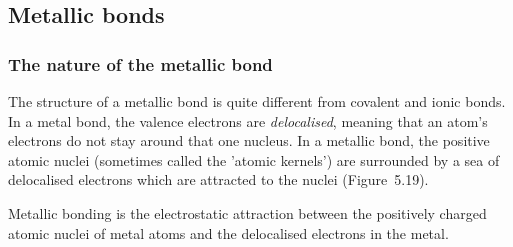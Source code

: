             \subsection{ Metallic bonds}
            \nopagebreak
      \label{m38694*uid77}
            \subsubsection{ The nature of the metallic bond}
            \nopagebreak
        \label{m38694*id142901}The structure of a metallic bond is quite different from covalent and ionic bonds. In a metal bond, the valence electrons are \textsl{delocalised}, meaning that an atom's electrons do not stay around that one nucleus. In a metallic bond, the positive atomic nuclei (sometimes called the 'atomic kernels') are surrounded by a sea of delocalised electrons which are attracted to the nuclei (Figure~5.19).\par 
\label{m38694*fhsst!!!underscore!!!id582}
 { \label{m38694*meaningfhsst!!!underscore!!!id582}
Metallic bonding is the electrostatic attraction between the positively charged atomic nuclei of metal atoms and the delocalised electrons in the metal.}
    \setcounter{subfigure}{0}
